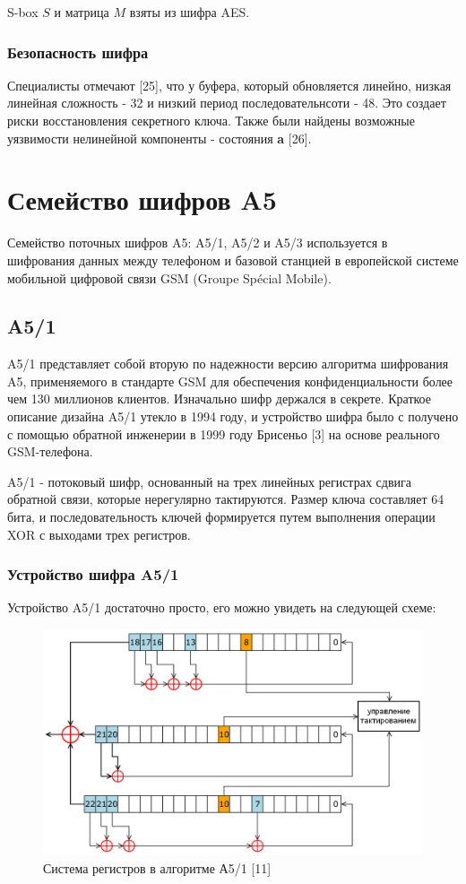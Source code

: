 \documentclass[colorthm]{./civarticle}
\begin{document}
S-box $S$ и матрица $M$ взяты из шифра AES.

\subsubsection{Безопасность шифра} 

Специалисты отмечают [25], что у буфера, который обновляется линейно, низкая линейная сложность - 32 и низкий период последовательнсоти - 48. Это создает риски восстановления секретного ключа. Также были найдены возможные уязвимости нелинейной компоненты - состояния \textbf{a} [26].

\section{Семейство шифров A5}

Семейство поточных шифров A5: A5/1, A5/2 и A5/3 используется в шифрования данных между телефоном и базовой станцией в европейской системе мобильной цифровой связи GSM (Groupe Spécial Mobile).

\subsection{A5/1} 

A5/1 представляет собой вторую по надежности версию алгоритма шифрования A5, применяемого в стандарте GSM для обеспечения конфиденциальности более чем 130 миллионов клиентов. Изначально шифр держался в секрете. Краткое описание дизайна A5/1 утекло в 1994 году, и устройство шифра было с получено с помощью обратной инженерии в 1999 году Брисеньо [3] на основе реального GSM-телефона.

A5/1 - потоковый шифр, основанный на трех линейных регистрах сдвига обратной связи, которые нерегулярно тактируются. Размер ключа составляет 64 бита, и последовательность ключей формируется путем выполнения операции XOR с выходами трех регистров.

\subsubsection{Устройство шифра A5/1}

Устройство A5/1 достаточно просто, его можно увидеть на следующей схеме:

\begin{figure}[H]
    \centering
    \includegraphics[width=0.5\linewidth]{РСЛОС_в_A5.png}
    \caption{Система регистров в алгоритме А5/1 [11]}
    \label{fig:enter-label}
\end{figure}
\end{document}
